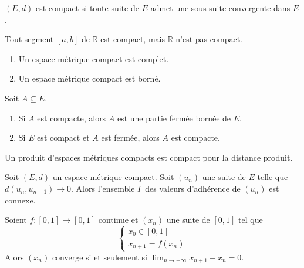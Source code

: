 	\begin{theorem}
		$(E,d)$ est compact si toute suite de $E$ admet une sous-suite convergente dans $E$.
	\end{theorem}

	\begin{example}
		Tout segment $[a,b]$ de $\mathbb{R}$ est compact, mais $\mathbb{R}$ n'est pas compact.
	\end{example}

	\begin{proposition}
		\begin{enumerate}[label=(\roman*)]
			\item Un espace métrique compact est complet.
			\item Un espace métrique compact est borné.
		\end{enumerate}
	\end{proposition}

	\begin{proposition}
		Soit $A \subseteq E$.
		\begin{enumerate}[label=(\roman*)]
			\item Si $A$ est compacte, alors $A$ est une partie fermée bornée de $E$.
			\item Si $E$ est compact et $A$ est fermée, alors $A$ est compacte.
		\end{enumerate}
	\end{proposition}

	\begin{proposition}
		Un produit d'espaces métriques compacts est compact pour la distance produit.
	\end{proposition}


	\begin{application}
		Soit $(E, d)$ un espace métrique compact. Soit $(u_n)$ une suite de $E$ telle que $d(u_n,u_{n-1}) \longrightarrow 0$. Alors l'ensemble $\Gamma$ des valeurs d'adhérence de $(u_n)$ est connexe.
	\end{application}


	\begin{corollary}
		Soient $f : [0, 1] \rightarrow [0, 1]$ continue et $(x_n)$ une suite de $[0, 1]$ tel que
		\[ \begin{cases} x_0 \in [0, 1] \\ x_{n+1} = f(x_n) \end{cases} \]
		Alors $(x_n)$ converge si et seulement si $\lim_{n \rightarrow +\infty } x_{n+1} - x_n = 0$.
	\end{corollary}

